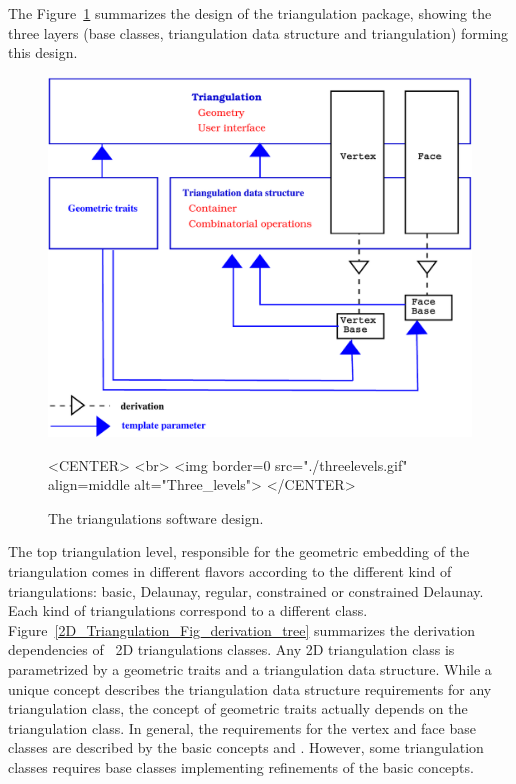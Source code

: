 The Figure~\ref{2D_Triangulation_Fig_three_levels} summarizes the design of the
triangulation package, showing the  three layers
(base classes, triangulation data structure and triangulation)
forming this design.

\begin{figure}
\begin{ccTexOnly}
\begin{center}
\includegraphics[width=13cm]{Triangulation_2/threelevels}
\end{center}
\end{ccTexOnly}

\begin{ccHtmlOnly}
<CENTER>
<br>
<img border=0 src="./threelevels.gif"  align=middle alt="Three_levels">
</CENTER>
\end{ccHtmlOnly}

\caption{The triangulations software design.
\label{2D_Triangulation_Fig_three_levels}}
\end{figure}

The top triangulation  level, responsible for the geometric 
embedding of the  triangulation comes in different flavors 
according to the different kind of triangulations:
basic, Delaunay, regular, constrained or constrained Delaunay.
Each kind of triangulations correspond to a different
class. 
Figure~\ref{2D_Triangulation_Fig_derivation_tree}  summarizes the derivation dependencies
of \cgal\ 2D triangulations classes.
Any 2D triangulation class is parametrized by
a geometric traits and a triangulation data structure.
While a  unique concept 
describes the   triangulation data structure requirements
for any  triangulation class, 
the concept of geometric traits actually depends
on the  triangulation class.
In general, the requirements for the vertex and face base classes 
are described by the basic concepts 
and  . However, some  triangulation
classes requires base classes implementing
refinements 
of the basic concepts.



